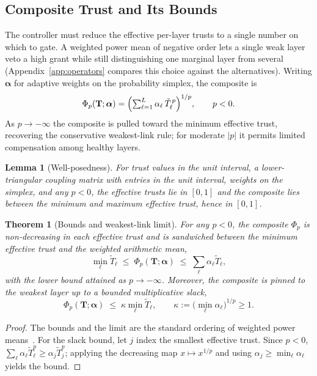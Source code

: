\documentclass[sigconf,anonymous]{acmart}
\theoremstyle{plain}
\newtheorem{theorem}{Theorem}
\newtheorem{lemma}{Lemma}
\theoremstyle{definition}
\theoremstyle{remark}
\begin{document}
\subsection{Composite Trust and Its Bounds}
The controller must reduce the effective per-layer trusts to a single number on which to
gate. A weighted power mean of negative order lets a single weak layer veto a high grant
while still distinguishing one marginal layer from several
(Appendix~\ref{app:operators} compares this choice against the alternatives).
Writing $\boldsymbol\alpha$ for adaptive weights on the probability simplex, the composite
is
\begin{equation}
\Phi_p(\mathbf{T};\boldsymbol\alpha)
= \Bigl(\textstyle\sum_{\ell=1}^{L}\alpha_\ell\,\tilde T_\ell^{\,p}\Bigr)^{1/p},\qquad p<0.
\label{eq:phi}
\end{equation}
As $p\to-\infty$ the composite is pulled toward the minimum effective trust, recovering
the conservative weakest-link rule; for moderate $|p|$ it permits limited compensation
among healthy layers.

\begin{lemma}[Well-posedness]
\label{lem:wellposed}
For trust values in the unit interval, a lower-triangular coupling matrix with entries in
the unit interval, weights on the simplex, and any $p<0$, the effective trusts lie in
$[0,1]$ and the composite lies between the minimum and maximum effective trust, hence in
$[0,1]$.
\end{lemma}

\begin{theorem}[Bounds and weakest-link limit]
\label{thm:bounds}
For any $p<0$, the composite $\Phi_p$ is non-decreasing in each effective trust and is
sandwiched between the minimum effective trust and the weighted arithmetic mean,
\begin{equation}
\min_\ell\tilde T_\ell \;\le\; \Phi_p(\mathbf{T};\boldsymbol\alpha)
\;\le\; \sum_\ell\alpha_\ell\tilde T_\ell,
\label{eq:thm1bounds}
\end{equation}
with the lower bound attained as $p\to-\infty$. Moreover, the composite is pinned to the
weakest layer up to a bounded multiplicative slack,
\begin{equation}
\Phi_p(\mathbf{T};\boldsymbol\alpha) \;\le\; \kappa\min_\ell\tilde T_\ell,\qquad
\kappa:=\bigl(\min_\ell\alpha_\ell\bigr)^{1/p}\ge1.
\label{eq:thm1kappa}
\end{equation}
\end{theorem}
\begin{proof}
The bounds and the limit are the standard ordering of weighted power
means~\cite{hardy1952inequalities}. For the slack bound, let $j$ index the smallest
effective trust. Since $p<0$, $\sum_\ell\alpha_\ell\tilde T_\ell^p\ge\alpha_j\tilde T_j^p$;
applying the decreasing map $x\mapsto x^{1/p}$ and using $\alpha_j\ge\min_\ell\alpha_\ell$
yields the bound.
\end{proof}
\end{document}
